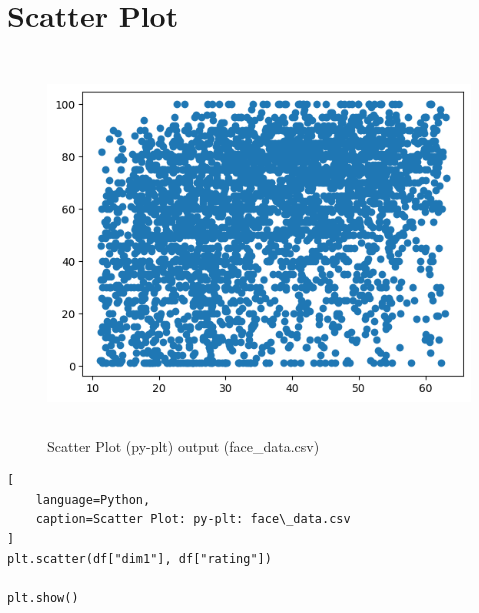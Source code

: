 \section{Scatter Plot \cite{data/online/seaborn.scatterplot, data/online/seaborn.scatterplot, data/online/wiki/Scatter_plot}} \label{Visualizing Data/Scatter Plot}


\begin{table}[H]
\begin{minipage}[t]{0.35\linewidth}
\begin{figure}[H]
    \centering
    \includegraphics[width=0.9\linewidth, height=10cm, keepaspectratio]{images/data/__visualizations__/plt-scatter-dim1-rating-face-data.png}
    \caption{Scatter Plot (py-plt) output (face\_data.csv)}
\end{figure}
\end{minipage}
\hspace{0.2cm}
\vrule width 1pt
\hspace{0.5cm}
\begin{minipage}[t]{0.57\linewidth}
\begin{lstlisting}[
    language=Python,
    caption=Scatter Plot: py-plt: face\_data.csv
]
plt.scatter(df["dim1"], df["rating"])

plt.show()
\end{lstlisting}
\end{minipage}
\end{table}

